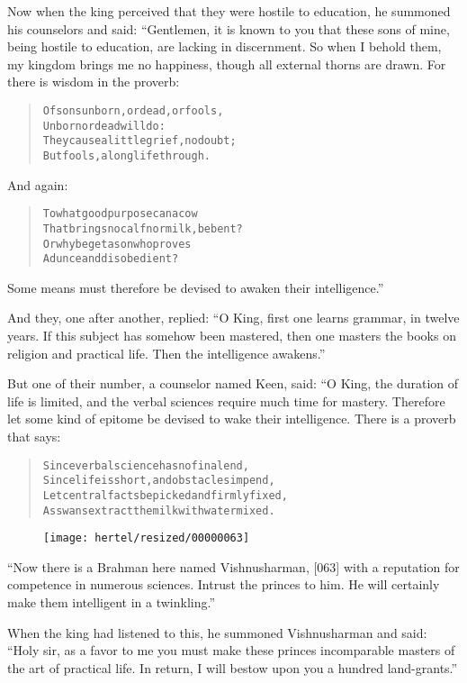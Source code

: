 \documentclass[article, twoside, 10pt]{memoir}
\renewenvironment{verbatim}{%
\begin{quote}%
\vskip -10pt%
\begin{alltt}\normalfont\small}{\end{alltt}%
\end{quote}%
\vskip -10pt
} %
\begin{document}
Now when the king perceived that they were hostile to education, he
summoned his counselors and said: “Gentlemen, it is known to you
that these sons of mine, being hostile to education, are lacking in
discernment. So when I behold them, my kingdom brings me no
happiness, though all external thorns are drawn. For there is
wisdom in the proverb:

\begin{verbatim}
Of sons unborn, or dead, or fools,
    Unborn or dead will do:
They cause a little grief, no doubt;
    But fools, a long life through.
\end{verbatim}
And again:

\begin{verbatim}
To what good purpose can a cow
    That brings no calf nor milk, be bent?
Or why beget a son who proves
    A dunce and disobedient?
\end{verbatim}
Some means must therefore be devised to awaken their
intelligence.”

And they, one after another, replied:
``O King, first one learns grammar, in twelve years. If this subject has somehow been mastered, then one masters the books on religion and practical life. Then the intelligence awakens.''

But one of their number, a counselor named Keen, said: “O King, the
duration of life is limited, and the verbal sciences require much
time for mastery. Therefore let some kind of epitome be devised to
wake their intelligence. There is a proverb that says:

\begin{verbatim}
Since verbal science has no final end,
Since life is short, and obstacles impend,
Let central facts be picked and firmly fixed,
As swans extract the milk with water mixed.
\end{verbatim}
\begin{figure}[p]\texttt{[image: hertel/resized/00000063]}\end{figure}``Now there is a Brahman here named Vishnusharman, [063] with a reputation for competence in numerous sciences. Intrust the princes to him. He will certainly make them intelligent in a twinkling.''

When the king had listened to this, he summoned Vishnusharman and
said:
``Holy sir, as a favor to me you must make these princes incomparable masters of the art of practical life. In return, I will bestow upon you a hundred land-grants.''
\end{document}
